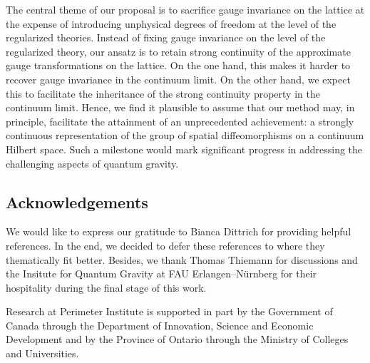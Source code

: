 The central theme of our proposal is to sacrifice gauge invariance on the lattice at the expense of introducing unphysical degrees of freedom at the level of the regularized theories.
Instead of fixing gauge invariance on the level of the regularized theory, our ansatz is to retain strong continuity of the approximate gauge transformations on the lattice.
On the one hand, this makes it harder to recover gauge invariance in the continuum limit.
On the other hand, we expect this to facilitate the inheritance of the strong continuity property in the continuum limit.
Hence, we find it plausible to assume that our method may, in principle, facilitate the attainment of an unprecedented achievement: a strongly continuous representation of the group of spatial diffeomorphisms on a continuum Hilbert space. Such a milestone would mark significant progress in addressing the challenging aspects of quantum gravity. 


\subsection*{Acknowledgements}
We would like to express our gratitude to Bianca Dittrich for providing helpful references.
In the end, we decided to defer these references to \textcite{gravity-continuum} where they thematically fit better.
Besides, we thank Thomas Thiemann for discussions and the Insitute for Quantum Gravity at FAU Erlangen--Nürnberg for their hospitality during the final stage of this work.

Research at Perimeter Institute is supported in part by the Government of Canada through the Department of Innovation, Science and Economic Development and by the Province of Ontario through the Ministry of Colleges and Universities.
